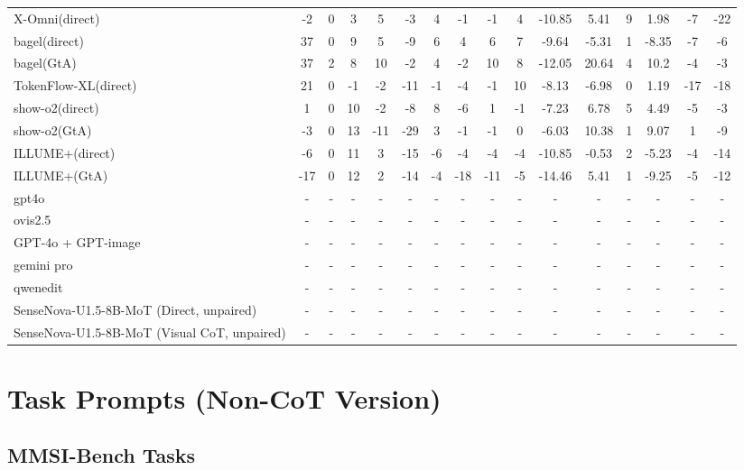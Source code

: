\documentclass{article}
\providecommand{\rowcolor}[1]{}
\theoremstyle{plain}
\theoremstyle{definition}
\theoremstyle{remark}
\begin{document}
\begin{table}[!htbp]
{\begin{tabular}{@{}lccccccccccccccc@{}}
X-Omni(direct) & -2 & 0 & 3 & 5 & -3 & 4 & -1 & -1 & 4 & -10.85 & 5.41 & 9 & 1.98 & -7 & -22 \\
bagel(direct) & 37 & 0 & 9 & 5 & -9 & 6 & 4 & 6 & 7 & -9.64 & -5.31 & 1 & -8.35 & -7 & -6 \\
bagel(GtA) & 37 & 2 & 8 & 10 & -2 & 4 & -2 & 10 & 8 & -12.05 & 20.64 & 4 & 10.2 & -4 & -3 \\
TokenFlow-XL(direct) & 21 & 0 & -1 & -2 & -11 & -1 & -4 & -1 & 10 & -8.13 & -6.98 & 0 & 1.19 & -17 & -18 \\
show-o2(direct) & 1 & 0 & 10 & -2 & -8 & 8 & -6 & 1 & -1 & -7.23 & 6.78 & 5 & 4.49 & -5 & -3 \\
show-o2(GtA) & -3 & 0 & 13 & -11 & -29 & 3 & -1 & -1 & 0 & -6.03 & 10.38 & 1 & 9.07 & 1 & -9 \\
ILLUME+(direct) & -6 & 0 & 11 & 3 & -15 & -6 & -4 & -4 & -4 & -10.85 & -0.53 & 2 & -5.23 & -4 & -14 \\
ILLUME+(GtA) & -17 & 0 & 12 & 2 & -14 & -4 & -18 & -11 & -5 & -14.46 & 5.41 & 1 & -9.25 & -5 & -12 \\
\midrule
\rowcolor{orange!8}
gpt4o & - & - & - & - & - & - & - & - & - & - & - & - & - & - & - \\
ovis2.5 & - & - & - & - &- & - & - & - & - & - & - & - & - & - & - \\
\midrule
GPT-4o + GPT-image & - & - & - & - & - & - & - & - & - & - & - & - & - & - & - \\
gemini pro & - & - & - & - & - & - & - & - & - & - & - & - & - & - & - \\
qwenedit & - & - & - & - & - & - & - & - & - & - & - & - & - & - & - \\
SenseNova-U1.5-8B-MoT (Direct, unpaired) & - & - & - & - & - & - & - & - & - & - & - & - & - & - & - \\
SenseNova-U1.5-8B-MoT (Visual CoT, unpaired) & - & - & - & - & - & - & - & - & - & - & - & - & - & - & - \\
\bottomrule
\end{tabular}%
}
\end{table}

\section{Task Prompts (Non-CoT Version)}
\label{app:non-cot}

\subsection{MMSI-Bench Tasks}
\end{document}

